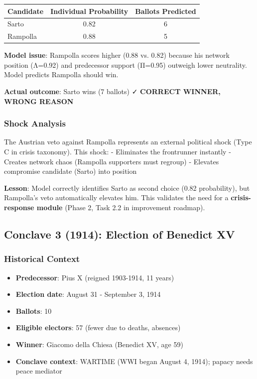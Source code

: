 \begin{center}
\begin{tabular}{lcc}
\toprule
\textbf{Candidate} & \textbf{Individual Probability} & \textbf{Ballots Predicted} \\
\midrule
Sarto & 0.82 & 6 \\
Rampolla & 0.88 & 5 \\
\bottomrule
\end{tabular}
\end{center}

\textbf{Model issue}: Rampolla scores higher (0.88 vs. 0.82) because his network position (Λ=0.92) and predecessor support (Π=0.95) outweigh lower neutrality. Model predicts Rampolla should win.

\textbf{Actual outcome}: Sarto wins (7 ballots) ✓ \textbf{CORRECT WINNER, WRONG REASON}

\subsubsection{Shock Analysis}

The Austrian veto against Rampolla represents an external political shock (Type C in crisis taxonomy). This shock:
- Eliminates the frontrunner instantly
- Creates network chaos (Rampolla supporters must regroup)
- Elevates compromise candidate (Sarto) into position

\textbf{Lesson}: Model correctly identifies Sarto as second choice (0.82 probability), but Rampolla's veto automatically elevates him. This validates the need for a \textbf{crisis-response module} (Phase 2, Task 2.2 in improvement roadmap).


\subsection{Conclave 3 (1914): Election of Benedict XV}

\subsubsection{Historical Context}

\begin{itemize}
    \item \textbf{Predecessor}: Pius X (reigned 1903-1914, 11 years)
    \item \textbf{Election date}: August 31 - September 3, 1914
    \item \textbf{Ballots}: 10
    \item \textbf{Eligible electors}: 57 (fewer due to deaths, absences)
    \item \textbf{Winner}: Giacomo della Chiesa (Benedict XV, age 59)
    \item \textbf{Conclave context}: WARTIME (WWI began August 4, 1914); papacy needs peace mediator
\end{itemize}

